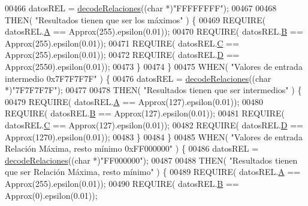 \begin{DoxyCode}
{00466             datosREL = \hyperlink{decoders_8cpp_a88d7079325bf81705583d9f2101cfa15}{decodeRelaciones}((\textcolor{keywordtype}{char} *)\textcolor{stringliteral}{"FFFFFFFF"});
00467 
00468             THEN( \textcolor{stringliteral}{"Resultados tienen que ser los máximos"} ) \{
00469                 REQUIRE( datosREL.\hyperlink{structRelacionesResponse_a560d1e6af01b999625b467ef3f858181}{A} == Approx(255).epsilon(0.01));
00470                 REQUIRE( datosREL.\hyperlink{structRelacionesResponse_a1216f6019af393dd85853f352533ed9d}{B} == Approx(255).epsilon(0.01));
00471                 REQUIRE( datosREL.\hyperlink{structRelacionesResponse_a37feda02f128b77f4f2d61cabcddc9e7}{C} == Approx(255).epsilon(0.01));
00472                 REQUIRE( datosREL.\hyperlink{structRelacionesResponse_ab76f55b12df3754a9bb5b102a1c06cbc}{D} == Approx(2550).epsilon(0.01));
00473             \}
00474         \}
00475         WHEN( \textcolor{stringliteral}{"Valores de entrada intermedio 0x7F7F7F7F"} ) \{
00476             datosREL = \hyperlink{decoders_8cpp_a88d7079325bf81705583d9f2101cfa15}{decodeRelaciones}((\textcolor{keywordtype}{char} *)\textcolor{stringliteral}{"7F7F7F7F"});
00477 
00478             THEN( \textcolor{stringliteral}{"Resultados tienen que ser intermedios"} ) \{
00479                 REQUIRE( datosREL.\hyperlink{structRelacionesResponse_a560d1e6af01b999625b467ef3f858181}{A} == Approx(127).epsilon(0.01));
00480                 REQUIRE( datosREL.\hyperlink{structRelacionesResponse_a1216f6019af393dd85853f352533ed9d}{B} == Approx(127).epsilon(0.01));
00481                 REQUIRE( datosREL.\hyperlink{structRelacionesResponse_a37feda02f128b77f4f2d61cabcddc9e7}{C} == Approx(127).epsilon(0.01));
00482                 REQUIRE( datosREL.\hyperlink{structRelacionesResponse_ab76f55b12df3754a9bb5b102a1c06cbc}{D} == Approx(1270).epsilon(0.01));
00483             \}
00484         \}
00485         WHEN( \textcolor{stringliteral}{"Valores de entrada Relación Máxima, resto mínimo 0xFF000000"} ) \{
00486             datosREL = \hyperlink{decoders_8cpp_a88d7079325bf81705583d9f2101cfa15}{decodeRelaciones}((\textcolor{keywordtype}{char} *)\textcolor{stringliteral}{"FF000000"});
00487 
00488             THEN( \textcolor{stringliteral}{"Resultados tienen que ser Relación Máxima, resto mínimo"} ) \{
00489                 REQUIRE( datosREL.\hyperlink{structRelacionesResponse_a560d1e6af01b999625b467ef3f858181}{A} == Approx(255).epsilon(0.01));
00490                 REQUIRE( datosREL.\hyperlink{structRelacionesResponse_a1216f6019af393dd85853f352533ed9d}{B} == Approx(0).epsilon(0.01));
}
\end{DoxyCode}
